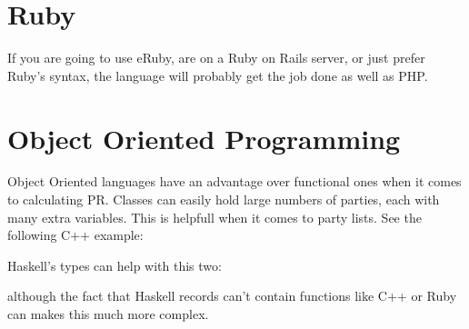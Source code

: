 \documentclass{article}
\begin{document}
    \section{Ruby}

    If you are going to use eRuby, are on a Ruby on Rails server, or just prefer Ruby's syntax, the language will probably get the job done as well as PHP.

    

    \section{Object Oriented Programming}

    Object Oriented languages have an advantage over functional ones when it comes to calculating PR. Classes can easily hold large numbers of parties, each with many extra variables. This is helpfull when it comes to party lists. See the following C++ example:

    

    Haskell's types can help with this two:

    

    although the fact that Haskell records can't contain functions like C++ or Ruby can makes this much more complex. 
\end{document}
